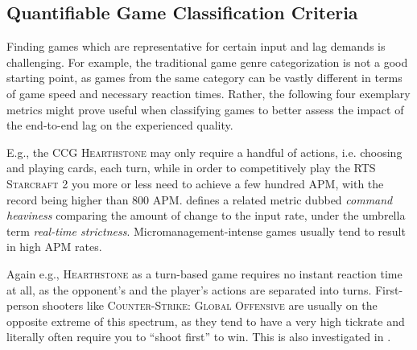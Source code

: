 


\subsection{Quantifiable Game Classification Criteria}

Finding games which are representative for certain input and lag demands is challenging. For example, the traditional game genre categorization is not a good starting point, as games from the same category can be vastly different in terms of game speed and necessary reaction times. Rather, the following four exemplary metrics might prove useful when classifying games to better assess the impact of the end-to-end lag on the experienced quality.

 E.g., the \gls{CCG} \textsc{Hearthstone} may only require a handful of actions, i.e. choosing and playing cards, each turn, while in order to competitively play the \gls{RTS} \textsc{Starcraft 2} you more or less need to achieve a few hundred \gls{APM}, with the record being higher than $800$ \gls{APM}. \cite{6404025} defines a related metric dubbed \textit{command heaviness} comparing the amount of change to the input rate, under the umbrella term \textit{real-time strictness}. Micromanagement-intense games usually tend to result in high APM rates.

 Again e.g., \textsc{Hearthstone} as a turn-based game requires no instant reaction time at all, as the opponent's and the player's actions are separated into turns. First-person shooters like \textsc{Counter-Strike: Global Offensive} are usually on the opposite extreme of this spectrum, as they tend to have a very high tickrate and literally often require you to ``shoot first'' to win. This is also investigated in \cite{Claypool:2006:LPA:1167838.1167860}.

